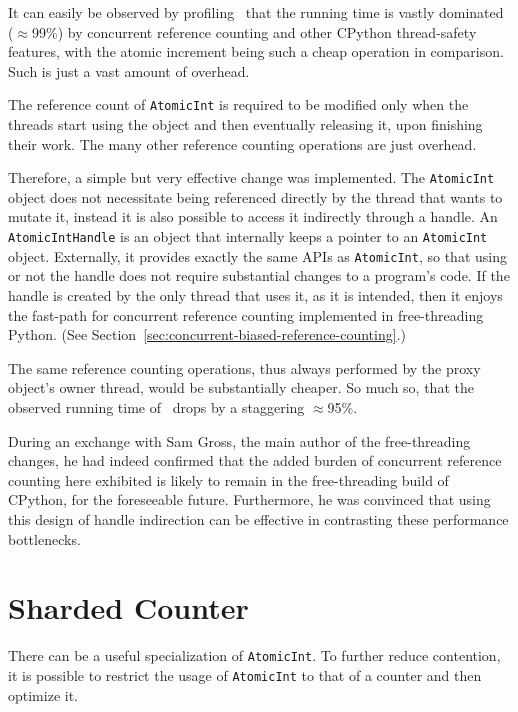 It can easily be observed by profiling~\cite[examples/atomic\_int/counter.py]{cereggii} that the running time is vastly dominated ($\approx$99\%) by concurrent reference counting and other CPython thread-safety features, with the atomic increment being such a cheap operation in comparison.
Such is just a vast amount of overhead.

The reference count of \texttt{AtomicInt} is required to be modified only when the threads start using the object and then eventually releasing it, upon finishing their work.
The many other reference counting operations are just overhead.

Therefore, a simple but very effective change was implemented.
The \texttt{Atomic\-Int} object does not necessitate being referenced directly by the thread that wants to mutate it, instead it is also possible to access it indirectly through a handle.
An \texttt{AtomicIntHandle} is an object that internally keeps a pointer to an \texttt{AtomicInt} object.
Externally, it provides exactly the same APIs as \texttt{AtomicInt}, so that using or not the handle does not require substantial changes to a program's code.
If the handle is created by the only thread that uses it, as it is intended, then it enjoys the fast-path for concurrent reference counting implemented in free-threading Python.
(See Section~\ref{sec:concurrent-biased-reference-counting}.)

The same reference counting operations, thus always performed by the proxy object's owner thread, would be substantially cheaper.
So much so, that the observed running time of~\cite[examples/atomic\_int/counter.py]{cereggii} drops by a staggering $\approx$95\%.

During an exchange with Sam Gross, the main author of the free-threading changes, he had indeed confirmed that the added burden of concurrent reference counting here exhibited is likely to remain in the free-threading build of CPython, for the foreseeable future.
Furthermore, he was convinced that using this design of handle indirection can be effective in contrasting these performance bottlenecks.


\section{Sharded Counter}\label{sec:atomicshardedintcounter}

There can be a useful specialization of \texttt{AtomicInt}.
To further reduce contention, it is possible to restrict the usage of \texttt{AtomicInt} to that of a counter and then optimize it.

